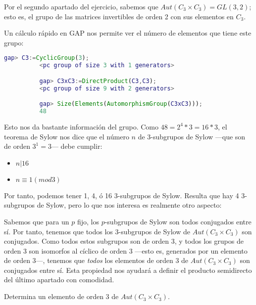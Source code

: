 \documentclass[a4paper, 11pt]{article}
\begin{document}
  \begin{solucion}
      Por el segundo apartado del ejercicio, sabemos que $Aut(C_3 \times C_3) = GL(3,2)$; esto es, el grupo de las matrices invertibles de orden 2 con sus elementos en $C_3$.

      Un cálculo rápido en GAP nos permite ver el número de elementos que tiene este grupo:
      \begin{lstlisting}[language=GAP]
          gap> C3:=CyclicGroup(3);
          <pc group of size 3 with 1 generators>

          gap> C3xC3:=DirectProduct(C3,C3);
          <pc group of size 9 with 2 generators>

          gap> Size(Elements(AutomorphismGroup(C3xC3)));
          48
      \end{lstlisting}

      Esto nos da bastante información del grupo. Como $48 = 2^4*3 = 16*3$, el teorema de Sylow nos dice que el número $n$ de 3-subgrupos de Sylow ---que son de orden $3^1=3$--- debe cumplir:
      \begin{itemize}
          \item $n | 16$
          \item $n \equiv 1 (mod 3)$
      \end{itemize}
      Por tanto, podemos tener 1, 4, ó 16 3-subgrupos de Sylow. Resulta que hay 4 3-subgrupos de Sylow, pero lo que nos interesa es realmente otro aspecto:

      Sabemos que para un $p$ fijo, los $p$-subgrupos de Sylow son todos conjugados entre sí. Por tanto, tenemos que todos los 3-subgrupos de Sylow de $Aut(C_3 \times C_3)$ son conjugados. Como todos estos subgrupos son de orden 3, y todos los grupos de orden 3 son isomorfos al cíclico de orden 3 ---esto es, generados por un elemento de orden 3---, tenemos que \emph{todos} los elementos de orden 3 de $Aut(C_3 \times C_3)$ son conjugados entre sí. Esta propiedad nos ayudará a definir el producto semidirecto del último apartado con comodidad.
  \end{solucion}

  \begin{apartado}
      Determina un elemento de orden 3 de $Aut(C_3 \times C_3)$.
  \end{apartado}
\end{document}
